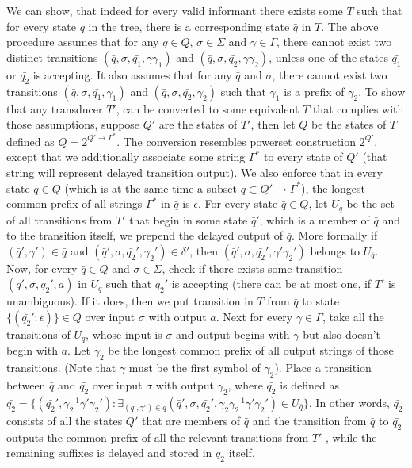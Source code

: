 We can show, that indeed for every valid informant there exists some $T$ such that for every state $q$ in the tree, there is a corresponding state $\bar{q}$ in $T$. The above procedure assumes that for any $\bar{q}\in Q$, $\sigma\in\Sigma$ and $\gamma\in\Gamma$, there cannot exist two distinct transitions $(\bar{q},\sigma,\bar{q_1},\gamma\gamma_1)$ and $(\bar{q},\sigma,\bar{q_2},\gamma\gamma_2)$, unless one of the states $\bar{q_1}$ or $\bar{q_2}$ is accepting. It also assumes that for any  $\bar{q}$ and $\sigma$, there cannot exist two transitions $(\bar{q},\sigma,\bar{q_1},\gamma_1)$ and $(\bar{q},\sigma,\bar{q_2},\gamma_2)$ such that $\gamma_1$ is a prefix of $\gamma_2$. To show that any transducer $T'$, can be converted to some equivalent $T$ that complies with those assumptions, suppose $Q'$ are the states of $T'$, then let $Q$ be the states of $T$ defined as $Q=2^{Q'\rightarrow\Gamma^*}$.
The conversion resembles powerset construction $2^{Q'}$, except that we additionally associate some string $\Gamma^*$ to every state of $Q'$ (that string will represent delayed transition output). 
We also enforce that in every state $\bar{q} \in Q$ (which is at the same time a subset $\bar{q} \subset Q'\rightarrow\Gamma^*$), the longest common prefix of all strings $\Gamma^*$ in $\bar{q}$ is $\epsilon$. For every state $\bar{q}\in Q$, let $U_{\bar{q}}$ be the set of all transitions from $T'$ that begin in some state $\bar{q}'$, which is a member of $\bar{q}$ and to the transition itself, we prepend the delayed output of $\bar{q}$. 
More formally if $(\bar{q}',\gamma')\in\bar{q}$ and $(\bar{q}',\sigma,\bar{q_2}',\gamma_2')\in\delta'$, then $(\bar{q}',\sigma,\bar{q_2}',\gamma'\gamma_2')$ belongs to $U_{\bar{q}}$. 
Now, for every $\bar{q}\in Q$ and $\sigma\in\Sigma$, check if there exists some transition  $(\bar{q}',\sigma,\bar{q_2}',a)$ in $U_{\bar{q}}$ such that $\bar{q_2}'$ is accepting (there can be at most one, if $T'$ is unambiguous). If it does, then we put transition in $T$ from $\bar{q}$ to state $\{(\bar{q_2}':\epsilon)\} \in Q$ over input $\sigma$ with output $a$. 
Next for every $\gamma\in\Gamma$, take all the transitions of $U_{\bar{q}}$,  whose input is $\sigma$ and output begins with $\gamma$ but also doesn't begin with $a$. 
Let $\gamma_2$ be the longest common prefix of all output strings of those transitions. 
(Note that $\gamma$ must be the first symbol of $\gamma_2$).  
Place a transition between $\bar{q}$ and $\bar{q_2}$ over input $\sigma$ with output $\gamma_2$, where $\bar{q_2}$ is defined as $\bar{q_2}=\{ (\bar{q_2}',\gamma_2^{-1}\gamma'\gamma_2') : \exists_{(\bar{q}',\gamma')\in\bar{q}} (\bar{q}',\sigma,\bar{q_2}',\gamma_2\gamma_2^{-1}\gamma'\gamma_2') \in U_{\bar{q}} \}$. In other words, $\bar{q_2}$ consists of all the states $Q'$ that are members of $\bar{q}$ and the transition from $\bar{q}$ to  $\bar{q_2}$ outputs the common prefix of all the relevant transitions from $T'$ , while the remaining suffixes is delayed and stored in $\bar{q_2}$ itself.
